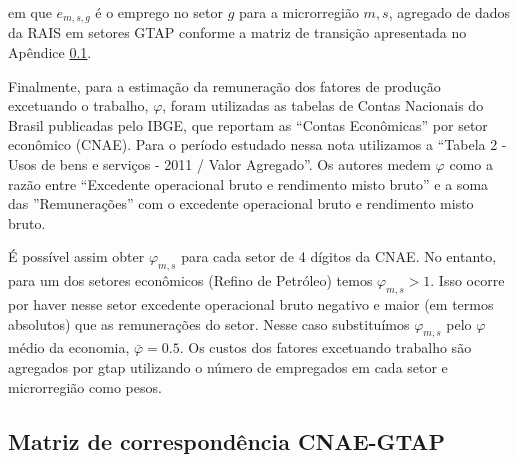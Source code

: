 \documentclass{article}
\begin{document}
em que $e_{m,s,g}$ é o emprego no setor $g$ para a microrregião $m,s$, agregado de dados da RAIS em setores GTAP conforme a matriz de transição apresentada no Apêndice \ref{appendix:CNAEGTAP}.

Finalmente, para a estimação da remuneração dos fatores de produção excetuando o trabalho, $\varphi$, foram utilizadas as tabelas de Contas Nacionais do Brasil publicadas pelo IBGE, que reportam as ``Contas Econômicas'' por setor econômico (CNAE). Para o período estudado nessa nota utilizamos a ``Tabela 2 - Usos de bens e serviços - 2011 / Valor Agregado''. Os autores medem  $\varphi$ como a razão entre ``Excedente operacional bruto e rendimento misto bruto'' e a soma das ''Remunerações'' com o excedente operacional bruto e rendimento misto bruto.

É possível assim obter  $\varphi_{m,s}$ para cada setor de 4 dígitos da  CNAE. No entanto, para um dos setores econômicos (Refino de Petróleo) temos $\varphi_{m,s}>1$. Isso ocorre por haver nesse setor  excedente operacional bruto negativo e maior (em termos absolutos) que as remunerações do setor. Nesse caso substituímos $\varphi_{m,s}$ pelo $\varphi$ médio da economia, $\bar \varphi=0.5$. Os custos dos fatores excetuando trabalho são agregados por gtap utilizando o número de empregados em cada setor e microrregião como pesos.

\subsection{Matriz de correspondência CNAE-GTAP}
\label{appendix:CNAEGTAP}
\end{document}
